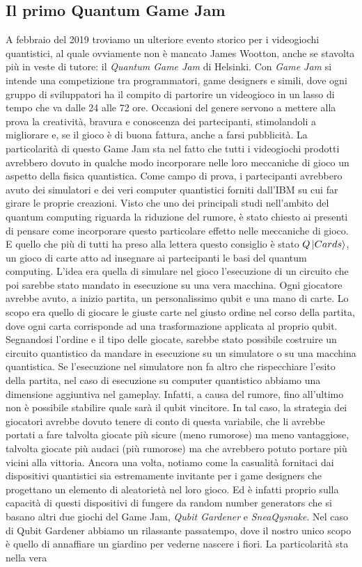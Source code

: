 \documentclass{book}
\theoremstyle{definition}
\theoremstyle{definition}
\theoremstyle{definition}
\theoremstyle{plain}
\theoremstyle{plain}
\theoremstyle{plain}
\theoremstyle{plain}
\begin{document}
\subsection{Il primo Quantum Game Jam}
A febbraio del 2019 troviamo un ulteriore evento storico per i videogiochi quantistici, al quale ovviamente non è mancato James Wootton, anche se stavolta più in veste di tutore: il \emph{Quantum Game Jam} di Helsinki\cite{wootton_helsinki}. Con \emph{Game Jam} si intende una competizione tra programmatori, game designers e simili, dove ogni gruppo di sviluppatori ha il compito di partorire un videogioco in un lasso di tempo che va dalle 24 alle 72 ore. Occasioni del genere servono a mettere alla prova la creatività, bravura e conoscenza dei partecipanti, stimolandoli a migliorare e, se il gioco è di buona fattura, anche a farsi pubblicità. La particolarità di questo Game Jam sta nel fatto che tutti i videogiochi prodotti avrebbero dovuto in qualche modo incorporare nelle loro meccaniche di gioco un aspetto della fisica quantistica. Come campo di prova, i partecipanti avrebbero avuto dei simulatori e dei veri computer quantistici forniti dall'IBM su cui far girare le proprie creazioni. Visto che uno dei principali studi nell'ambito del quantum computing riguarda la riduzione del rumore, è stato chiesto ai presenti di pensare come incorporare questo particolare effetto nelle meccaniche di gioco. E quello che più di tutti ha preso alla lettera questo consiglio è stato $Q\ket{Cards}$, un gioco di carte atto ad insegnare ai partecipanti le basi del quantum computing. L'idea era quella di simulare nel gioco l'esecuzione di un circuito che poi sarebbe stato mandato in esecuzione su una vera macchina. Ogni giocatore avrebbe avuto, a inizio partita, un personalissimo qubit e una mano di carte. Lo scopo era quello di giocare le giuste carte nel giusto ordine nel corso della partita, dove ogni carta corrisponde ad una trasformazione applicata al proprio qubit. Segnandosi l'ordine e il tipo delle giocate, sarebbe stato possibile costruire un circuito quantistico da mandare in esecuzione su un simulatore o su una macchina quantistica. Se l'esecuzione nel simulatore non fa altro che rispecchiare l'esito della partita, nel caso di esecuzione su computer quantistico abbiamo una dimensione aggiuntiva nel gameplay. Infatti, a causa del rumore, fino all'ultimo non è possibile stabilire quale sarà il qubit vincitore. In tal caso, la strategia dei giocatori avrebbe dovuto tenere di conto di questa variabile, che li avrebbe portati a fare talvolta giocate più sicure (meno rumorose) ma meno vantaggiose, talvolta giocate più audaci (più rumorose) ma che avrebbero potuto portare più vicini alla vittoria. Ancora una volta, notiamo come la casualità fornitaci dai dispositivi quantistici sia estremamente invitante per i game designers che progettano un elemento di aleatorietà nel loro gioco. Ed è infatti proprio sulla capacità di questi dispositivi di fungere da random number generators che si basano altri due giochi del Game Jam, \emph{Qubit Gardener} e \emph{SneaQysnake}. Nel caso di Qubit Gardener abbiamo un rilassante passatempo, dove il nostro unico scopo è quello di annaffiare un giardino per vederne nascere i fiori. La particolarità sta nella vera 
\end{document}
